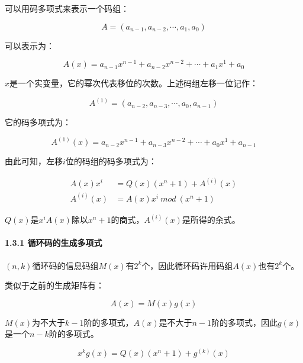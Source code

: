 \documentclass[
]{article}
\begin{document}
可以用码多项式来表示一个码组：

\begin{equation}
A = (a_{n-1},a_{n-2},\cdots,a_{1},a_{0})
\end{equation}

可以表示为：

\begin{equation}
A(x) = a_{n-1}x^{n-1}+a_{n-2}x^{n-2}+\cdots+a_{1}x^{1}+a_{0}
\end{equation}

$x$是一个实变量，它的幂次代表移位的次数。上述码组左移一位记作：

\begin{equation}
A^{(1)} = (a_{n-2},a_{n-3},\cdots,a_{0},a_{n-1})
\end{equation}

它的码多项式为：

\begin{equation}
A^{(1)}(x) = a_{n-2}x^{n-1}+a_{n-3}x^{n-2}+\cdots+a_{0}x^{1}+a_{n-1}
\end{equation}

由此可知，左移$i$位的码组的码多项式为：

\begin{equation}
\begin{aligned}
A(x)x^i &= Q(x)(x^n+1)+A^{(i)}(x)\\
A^{(i)}(x) &= A(x)x^i \: mod \: (x^n+1)
\end{aligned}
\end{equation}

$Q(x)$是$x^iA(x)$除以$x^n+1$的商式，$A^{(i)}(x)$是所得的余式。

\hypertarget{header-n44}{%
\paragraph{1.3.1 循环码的生成多项式}\label{header-n44}}

$(n,k)$循环码的信息码组$M(x)$有$2^k$个，因此循环码许用码组$A(x)$也有$2^k$个。

类似于之前的生成矩阵有：

\begin{equation}
A(x)=M(x)g(x)
\end{equation}

$M(x)$为不大于$k-1$阶的多项式，$A(x)$是不大于$n-1$阶的多项式，因此$g(x)$是一个$n-k$阶的多项式。

\begin{equation}
x^kg(x)=Q(x)(x^n+1)+g^{(k)}(x)
\end{equation}
\end{document}
